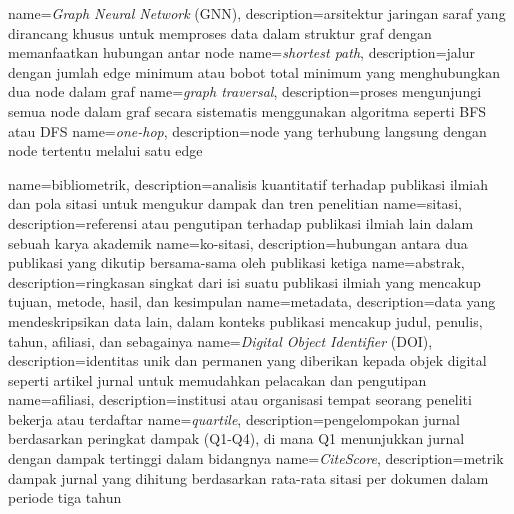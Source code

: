 {
	name={\textit{Graph Neural Network} (GNN)},
	description={arsitektur jaringan saraf yang dirancang khusus untuk memproses data dalam struktur graf dengan memanfaatkan hubungan antar node}
}
{
	name={\textit{shortest path}},
	description={jalur dengan jumlah edge minimum atau bobot total minimum yang menghubungkan dua node dalam graf}
}
{
	name={\textit{graph traversal}},
	description={proses mengunjungi semua node dalam graf secara sistematis menggunakan algoritma seperti BFS atau DFS}
}
{
	name={\textit{one-hop}},
	description={node yang terhubung langsung dengan node tertentu melalui satu edge}
}

{
	name={bibliometrik},
	description={analisis kuantitatif terhadap publikasi ilmiah dan pola sitasi untuk mengukur dampak dan tren penelitian}
}
{
	name={sitasi},
	description={referensi atau pengutipan terhadap publikasi ilmiah lain dalam sebuah karya akademik}
}
{
	name={ko-sitasi},
	description={hubungan antara dua publikasi yang dikutip bersama-sama oleh publikasi ketiga}
}
{
	name={abstrak},
	description={ringkasan singkat dari isi suatu publikasi ilmiah yang mencakup tujuan, metode, hasil, dan kesimpulan}
}
{
	name={metadata},
	description={data yang mendeskripsikan data lain, dalam konteks publikasi mencakup judul, penulis, tahun, afiliasi, dan sebagainya}
}
{
	name={\textit{Digital Object Identifier} (DOI)},
	description={identitas unik dan permanen yang diberikan kepada objek digital seperti artikel jurnal untuk memudahkan pelacakan dan pengutipan}
}
{
	name={afiliasi},
	description={institusi atau organisasi tempat seorang peneliti bekerja atau terdaftar}
}
{
	name={\textit{quartile}},
	description={pengelompokan jurnal berdasarkan peringkat dampak (Q1-Q4), di mana Q1 menunjukkan jurnal dengan dampak tertinggi dalam bidangnya}
}
{
	name={\textit{CiteScore}},
	description={metrik dampak jurnal yang dihitung berdasarkan rata-rata sitasi per dokumen dalam periode tiga tahun}
}

